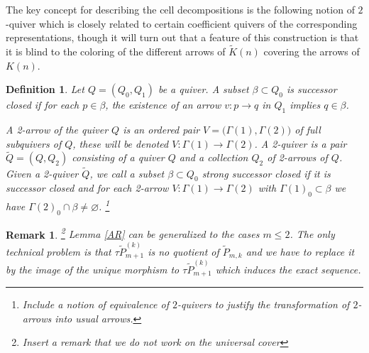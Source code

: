 \documentclass{amsart}
\newtheorem{definition}[theorem]{Definition}
\newtheorem{remark}[theorem]{Remark}
\newcommand{\Gr}{\mathrm{Gr}}
\begin{document}
The key concept for describing the cell decompositions is the following notion of $2$-quiver which is closely related to certain coefficient quivers of the corresponding representations, though it will turn out that a feature of this construction is that it is blind to the coloring of the different arrows of $\widetilde K(n)$ covering the arrows of $K(n)$.
\begin{definition}
  Let $Q=(Q_0,Q_1)$ be a quiver.
  A subset $\beta\subset Q_0$ is \emph{successor closed} if for each $p\in\beta$, the existence of an arrow $v:p\to q$ in $Q_1$ implies $q\in\beta$.

  A \emph{2-arrow} of the quiver $Q$ is an ordered pair $V=\big(\Gamma(1),\Gamma(2)\big)$ of full subquivers of $Q$, these will be denoted $V:\Gamma(1)\to\Gamma(2)$.
  A \emph{2-quiver} is a pair $\tilde Q=(Q,Q_2)$ consisting of a quiver $Q$ and a collection $Q_2$ of 2-arrows of $Q$.
  Given a 2-quiver $\tilde Q$, we call a subset $\beta\subset Q_0$ \emph{strong successor closed} if it is successor closed and for each 2-arrow $V:\Gamma(1)\to\Gamma(2)$ with $\Gamma(1)_0\subset\beta$ we have $\Gamma(2)_0\cap\beta\ne\varnothing$.  
  \footnote{Include a notion of equivalence of $2$-quivers to justify the transformation of $2$-arrows into usual arrows.}
\end{definition}


\begin{remark}\footnote{Insert a remark that we do not work on the universal cover} 
  Lemma \ref{AR} can be generalized to the cases $m\leq 2$.
  The only technical problem is that $\tau \tilde P^{(k)}_{m+1}$ is no quotient of $\tilde P_{m,k}$ and we have to replace it by the image of the unique morphism to $\tau \tilde P^{(k)}_{m+1}$ which induces the exact sequence. 
\end{remark}
\end{document}
